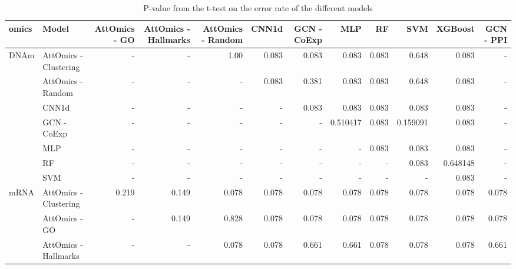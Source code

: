 \begin{sidewaystable}
	\centering
	\caption{P-value from the t-test on the error rate of the different models}
	\begin{tabular}{llrrrrrrrrrr}
		\toprule
		omics                  & Model                 & AttOmics - GO & AttOmics - Hallmarks & AttOmics - Random & CNN1d & GCN - CoExp & MLP      & RF    & SVM      & XGBoost  & GCN - PPI \\
		\midrule
		\multirow{7}{*}{DNAm}  & AttOmics - Clustering & -             & -                    & 1.00              & 0.083 & 0.083       & 0.083    & 0.083 & 0.648    & 0.083    & -         \\
		                       & AttOmics - Random     & -             & -                    & -                 & 0.083 & 0.381       & 0.083    & 0.083 & 0.648    & 0.083    & -         \\
		                       & CNN1d                 & -             & -                    & -                 & -     & 0.083       & 0.083    & 0.083 & 0.083    & 0.083    & -         \\
		                       & GCN - CoExp           & -             & -                    & -                 & -     & -           & 0.510417 & 0.083 & 0.159091 & 0.083    & -         \\
		                       & MLP                   & -             & -                    & -                 & -     & -           & -        & 0.083 & 0.083    & 0.083    & -         \\
		                       & RF                    & -             & -                    & -                 & -     & -           & -        & -     & 0.083    & 0.648148 & -         \\
		                       & SVM                   & -             & -                    & -                 & -     & -           & -        & -     & -        & 0.083    & -         \\
		\midrule
		\multirow{10}{*}{mRNA} & AttOmics - Clustering & 0.219         & 0.149                & 0.078             & 0.078 & 0.078       & 0.078    & 0.078 & 0.078    & 0.078    & 0.078     \\
		                       & AttOmics - GO         & -             & 0.149                & 0.828             & 0.078 & 0.078       & 0.078    & 0.078 & 0.078    & 0.078    & 0.078     \\
		                       & AttOmics - Hallmarks  & -             & -                    & 0.078             & 0.078 & 0.661       & 0.661    & 0.078 & 0.078    & 0.078    & 0.661     \\

\end{tabular}
\end{sidewaystable}

